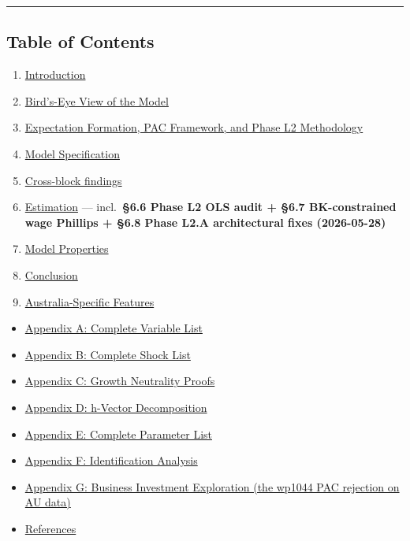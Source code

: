 \documentclass[
]{article}
\providecommand{\tightlist}{%
  \setlength{\itemsep}{0pt}\setlength{\parskip}{0pt}}
\begin{document}
\begin{center}\rule{0.5\linewidth}{0.5pt}\end{center}

\subsection{Table of Contents}\label{table-of-contents}

\begin{enumerate}
\def\labelenumi{\arabic{enumi}.}
\tightlist
\item
  \hyperref[1-introduction]{Introduction}
\item
  \hyperref[2-birds-eye-view]{Bird's-Eye View of the Model}
\item
  \hyperref[3-expectation-formation-and-the-pac-framework]{Expectation
  Formation, PAC Framework, and Phase L2 Methodology}
\item
  \hyperref[4-model-specification]{Model Specification}
\item
  \hyperref[5-cross-block-findings]{Cross-block findings}
\item
  \hyperref[6-estimation]{Estimation} --- incl.~\textbf{§6.6 Phase L2
  OLS audit + §6.7 BK-constrained wage Phillips + §6.8 Phase L2.A
  architectural fixes (2026-05-28)}
\item
  \hyperref[7-model-properties]{Model Properties}
\item
  \hyperref[8-conclusion]{Conclusion}
\item
  \hyperref[9-australia-specific-features]{Australia-Specific Features}
\end{enumerate}

\begin{itemize}
\tightlist
\item
  \hyperref[appendix-a-complete-variable-list]{Appendix A: Complete
  Variable List}
\item
  \hyperref[appendix-b-complete-shock-list]{Appendix B: Complete Shock
  List}
\item
  \hyperref[appendix-c-growth-neutrality-proofs]{Appendix C: Growth
  Neutrality Proofs}
\item
  \hyperref[appendix-d-h-vector-decomposition]{Appendix D: h-Vector
  Decomposition}
\item
  \hyperref[appendix-e-complete-parameter-list]{Appendix E: Complete
  Parameter List}
\item
  \hyperref[appendix-f-identification-analysis]{Appendix F:
  Identification Analysis}
\item
  \hyperref[appendix-g-business-investment-exploration-the-wp1044-pac-rejection-on-au-data]{Appendix
  G: Business Investment Exploration (the wp1044 PAC rejection on AU
  data)}
\item
  \hyperref[references]{References}
\end{itemize}
\end{document}
